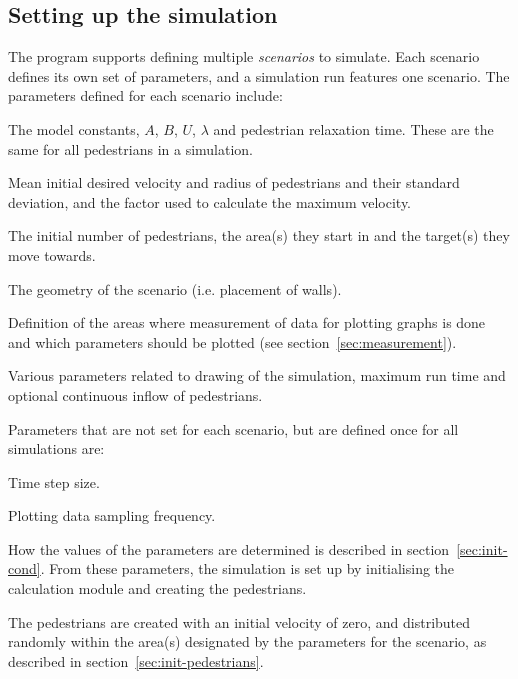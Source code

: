 \subsection{Setting up the simulation}
The program supports defining multiple \emph{scenarios} to simulate. Each 
scenario defines its own set of parameters, and a simulation run features one 
scenario. The parameters defined for each scenario include:

\begin{itemize*}
    \item The model constants, $A$, $B$, $U$, $\lambda$ and pedestrian relaxation 
        time. These are the same for all pedestrians in a simulation.
    \item Mean initial desired velocity and radius of pedestrians and their standard 
        deviation, and the factor used to calculate the maximum velocity.
    \item The initial number of pedestrians, the area(s) they start in and the 
        target(s) they move towards.
    \item The geometry of the scenario (i.e. placement of walls).
    \item Definition of the areas where measurement of data for plotting 
        graphs is done and which parameters should be plotted (see 
        section~\ref{sec:measurement}).
    \item Various parameters related to drawing of the simulation, maximum run 
        time and optional continuous inflow of pedestrians.
\end{itemize*}

Parameters that are not set for each scenario, but are defined once for all 
simulations are:

\begin{itemize*}
    \item Time step size.
    \item Plotting data sampling frequency.
\end{itemize*}

How the values of the parameters are determined is described in 
section~\ref{sec:init-cond}. From these parameters, the simulation is set up 
by initialising the calculation module and creating the pedestrians.

The pedestrians are created with an initial velocity of zero, and distributed 
randomly within the area(s) designated by the parameters for the scenario, as 
described in section~\ref{sec:init-pedestrians}. 

